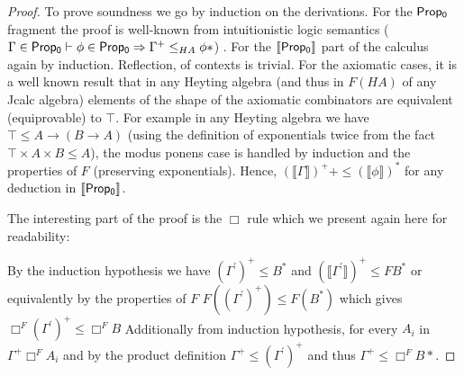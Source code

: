 \begin{proof}
    To prove soundness we go by induction on the derivations. 
    For the ${\sf Prop_0}$ fragment
    the proof is well-known from intuitionistic logic semantics 
    ($\Gamma\in{\sf Prop_0}\vdash \phi\in {\sf Prop_0}
    \Rightarrow \Gamma^+\le_{HA}\phi *$)
    . 
    For the ${\sf \llbracket Prop_0\rrbracket}$ part of the calculus again by induction.
    Reflection, of contexts is trivial. For the axiomatic cases, it is a well known result
    that in any Heyting algebra (and thus in $F(HA)$ of any Jcalc algebra) 
    elements of the shape of the axiomatic combinators are equivalent 
    (equiprovable) to $\top$.
    For example in any Heyting algebra  we have $\top\le A\rightarrow(B\rightarrow A)$ 
    (using the definition of exponentials twice from the fact $\top\times A\times B\le A$), 
    the modus ponens case is handled by induction and the properties of $F$ 
    (preserving exponentials). Hence,
    $(\llbracket\Gamma\rrbracket)^{+}+\leq(\llbracket\phi\rrbracket)^{*}$ for any deduction in $\llbracket{\sf Prop_0} \rrbracket$.


    The interesting part of the proof is the $\Box$ rule which we present again here for readability:
    
    By the induction hypothesis we have $(\Gamma^{'})^{+}\le B^{*}$
    and $(\llbracket\Gamma^{'}\rrbracket)^{+}\le FB^{*}$ or equivalently by the properties of $F$
    $F((\Gamma^{'})^{+})\le F(B^{*})$ which gives $\Box^F{(\Gamma^{'})^{+}}\le \Box^F B$
    Additionally from induction hypothesis, for every $A_i$ in $\Gamma^{+}\Box^F A_i$
    and by the product definition $\Gamma^{+}\le(\Gamma^{'})^{+}$ and thus
    $\Gamma^{+}\le\Box^F B*$.


\end{proof}

